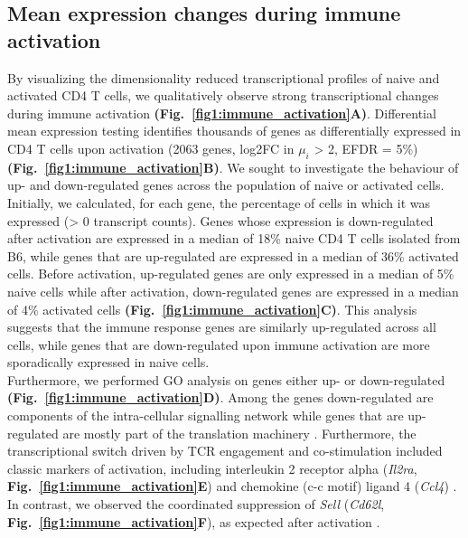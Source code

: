 \subsection{Mean expression changes during immune activation}

By visualizing the dimensionality reduced transcriptional profiles of naive and activated CD4\plus{} T cells, we qualitatively observe strong transcriptional changes during immune activation \textbf{(Fig.~\ref{fig1:immune_activation}A)}. Differential mean expression testing identifies thousands of genes as differentially expressed in CD4\plus{} T cells upon activation (2063 genes, log2FC in $\mu_i$ > 2, EFDR = 5\%) \textbf{(Fig.~\ref{fig1:immune_activation}B)}. We sought to investigate the behaviour of up- and down-regulated genes across the population of naive or activated cells. Initially, we calculated, for each gene, the percentage of cells in which it was expressed (> 0 transcript counts). Genes whose expression is down-regulated after activation are expressed in a median of 18\% naive CD4\plus{} T cells isolated from B6, while genes that are up-regulated are expressed in a median of 36\% activated cells. Before activation, up-regulated genes are only expressed in a median of 5\% naive cells while after activation, down-regulated genes are expressed in a median of 4\% activated cells \textbf{(Fig.~\ref{fig1:immune_activation}C)}. This analysis suggests that the immune response genes are similarly up-regulated across all cells, while genes that are down-regulated upon immune activation are more sporadically expressed in naive cells. \\

Furthermore, we performed GO analysis on genes either up- or down-regulated \textbf{(Fig.~\ref{fig1:immune_activation}D)}. Among the genes down-regulated are components of the intra-cellular signalling network while genes that are up-regulated are mostly part of the translation machinery \citep{Bjur2013}. Furthermore, the transcriptional switch driven by TCR engagement and co-stimulation included classic markers of activation, including interleukin 2 receptor alpha (\textit{Il2ra}, \textbf{Fig.~\ref{fig1:immune_activation}E}) and chemokine (c-c motif) ligand 4 (\textit{Ccl4}) \citep{Asmal2003}. In contrast, we observed the coordinated suppression of \textit{Sell} (\textit{Cd62l}, \textbf{Fig.~\ref{fig1:immune_activation}F}), as expected after activation \citep{Park2005}.

\newpage

